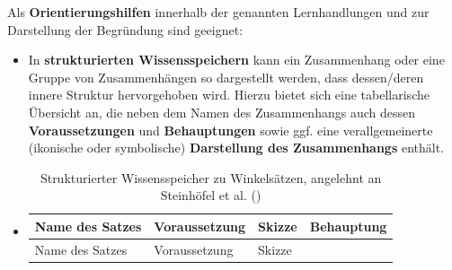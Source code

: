 \documentclass[
]{scrbook}
\renewenvironment{quote}{
  \list{}{
	\leftmargin0.2cm   %
    \rightmargin\leftmargin
      	\def\FrameCommand
    {%
        {\color{quoteColor}\vrule width 2pt}%
        \hspace{0pt}%
    }%
    \MakeFramed{\advance \hsize -\width \FrameRestore}    \color{quoteColor}
    }
  \item\relax
}
{\endlist\color{black}\endMakeFramed}
\theoremstyle{definition}
\theoremstyle{definition}
\theoremstyle{definition}
\theoremstyle{definition}
\theoremstyle{remark}
\begin{document}
Als \textbf{Orientierungshilfen} innerhalb der genannten Lernhandlungen und zur Darstellung der Begründung sind geeignet:

\begin{itemize}
\item
  In \textbf{strukturierten Wissensspeichern} kann ein Zusammenhang oder eine Gruppe von Zusammenhängen so dargestellt werden, dass dessen/deren innere Struktur hervorgehoben wird. Hierzu bietet sich eine tabellarische Übersicht an, die neben dem Namen des Zusammenhangs auch dessen \textbf{Voraussetzungen} und \textbf{Behauptungen} sowie ggf. eine verallgemeinerte (ikonische oder symbolische) \textbf{Darstellung des Zusammenhangs} enthält.

  \begin{quote}
  \begin{longtable}[]{@{}
    >{\raggedright\arraybackslash}p{}
    >{\raggedright\arraybackslash}p{}
    >{\centering\arraybackslash}p{}
    >{\raggedright\arraybackslash}p{}@{}}
  \caption{\label{tab:wissensspeicher} Strukturierter Wissensspeicher zu Winkelsätzen, angelehnt an Steinhöfel et al. ()}\tabularnewline
  \toprule\noalign{}
  \begin{minipage}[b]{\linewidth}\raggedright
  Name des Satzes
  \end{minipage} & \begin{minipage}[b]{\linewidth}\raggedright
  Voraussetzung
  \end{minipage} & \begin{minipage}[b]{\linewidth}\centering
  Skizze
  \end{minipage} & \begin{minipage}[b]{\linewidth}\raggedright
  Behauptung
  \end{minipage} \\
  \midrule\noalign{}
  \endfirsthead
  \toprule\noalign{}
  \begin{minipage}[b]{\linewidth}\raggedright
  Name des Satzes
  \end{minipage} & \begin{minipage}[b]{\linewidth}\raggedright
  Voraussetzung
  \end{minipage} & \begin{minipage}[b]{\linewidth}\centering
  Skizze
  \end{minipage} & \begin{minipage}[b]{\linewidth}\raggedright

\end{minipage}
\end{longtable}
\end{quote}
\end{itemize}
\end{document}
